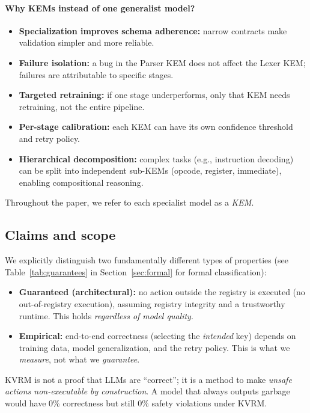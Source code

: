 \documentclass[11pt]{article}
\begin{document}
\paragraph{Why KEMs instead of one generalist model?}
\begin{itemize}[leftmargin=*]
  \item \textbf{Specialization improves schema adherence:} narrow contracts make validation simpler and more reliable.
  \item \textbf{Failure isolation:} a bug in the Parser KEM does not affect the Lexer KEM; failures are attributable to specific stages.
  \item \textbf{Targeted retraining:} if one stage underperforms, only that KEM needs retraining, not the entire pipeline.
  \item \textbf{Per-stage calibration:} each KEM can have its own confidence threshold and retry policy.
  \item \textbf{Hierarchical decomposition:} complex tasks (e.g., instruction decoding) can be split into independent sub-KEMs (opcode, register, immediate), enabling compositional reasoning.
\end{itemize}
Throughout the paper, we refer to each specialist model as a \emph{KEM}.

\subsection{Claims and scope}
We explicitly distinguish two fundamentally different types of properties (see Table~\ref{tab:guarantees} in Section~\ref{sec:formal} for formal classification):
\begin{itemize}[leftmargin=*]
  \item \textbf{Guaranteed (architectural):} no action outside the registry is executed (no out-of-registry execution), assuming registry integrity and a trustworthy runtime. This holds \emph{regardless of model quality}.
  \item \textbf{Empirical:} end-to-end correctness (selecting the \emph{intended} key) depends on training data, model generalization, and the retry policy. This is what we \emph{measure}, not what we \emph{guarantee}.
\end{itemize}
KVRM is not a proof that LLMs are ``correct''; it is a method to make \emph{unsafe actions non-executable by construction}. A model that always outputs garbage would have 0\% correctness but still 0\% safety violations under KVRM.
\end{document}

